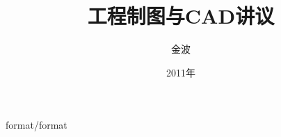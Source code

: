 \documentclass[12pt,twoside]{book}
\begin{document}
\begin{CJK}{UTF8}{song}
 {format/format}
\title{工程制图与CAD讲议}
\author{金波}
\date{2011年}
\maketitle
\CJKtilde
\frontmatter
\tableofcontents
\mainmatter
\graphicspath{{cad/pdf/}{cad/png/}}












\newpage
\end{CJK}
\end{document}
